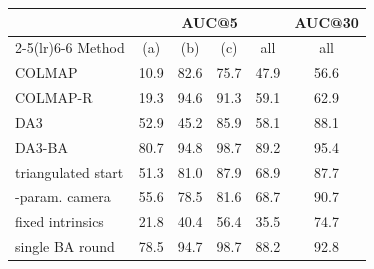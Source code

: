 \begin{tabular}{l cccc c}
\toprule
 & \multicolumn{4}{c}{AUC@5} & AUC@30 \\
\cmidrule(lr){2-5}\cmidrule(lr){6-6}
Method & (a) & (b) & (c) & all & all \\
\midrule
COLMAP & 10.9 & 82.6 & 75.7 & 47.9 & 56.6 \\
COLMAP-R & 19.3 & 94.6 & 91.3 & 59.1 & 62.9 \\
DA3 & 52.9 & 45.2 & 85.9 & 58.1 & 88.1 \\
\midrule
DA3-BA & 80.7 & 94.8 & 98.7 & 89.2 & 95.4 \\
\quad triangulated start & 51.3 & 81.0 & 87.9 & 68.9 & 87.7 \\
\quad 1-param. camera & 55.6 & 78.5 & 81.6 & 68.7 & 90.7 \\
\quad fixed intrinsics & 21.8 & 40.4 & 56.4 & 35.5 & 74.7 \\
\quad single BA round & 78.5 & 94.7 & 98.7 & 88.2 & 92.8 \\
\bottomrule
\end{tabular}
